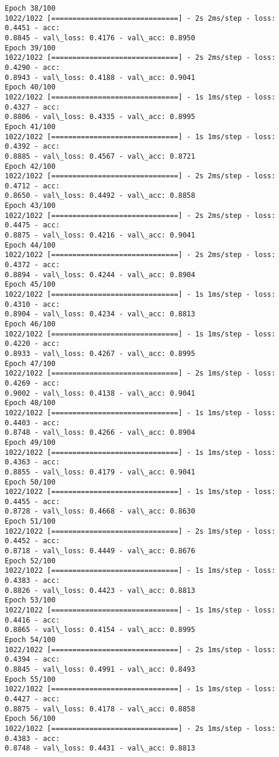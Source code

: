 \documentclass[11pt]{article}
\begin{document}
\begin{Verbatim}[commandchars=\\\{\}]
Epoch 38/100
1022/1022 [==============================] - 2s 2ms/step - loss: 0.4451 - acc:
0.8845 - val\_loss: 0.4176 - val\_acc: 0.8950
Epoch 39/100
1022/1022 [==============================] - 2s 2ms/step - loss: 0.4290 - acc:
0.8943 - val\_loss: 0.4188 - val\_acc: 0.9041
Epoch 40/100
1022/1022 [==============================] - 1s 1ms/step - loss: 0.4327 - acc:
0.8806 - val\_loss: 0.4335 - val\_acc: 0.8995
Epoch 41/100
1022/1022 [==============================] - 1s 1ms/step - loss: 0.4392 - acc:
0.8885 - val\_loss: 0.4567 - val\_acc: 0.8721
Epoch 42/100
1022/1022 [==============================] - 2s 2ms/step - loss: 0.4712 - acc:
0.8650 - val\_loss: 0.4492 - val\_acc: 0.8858
Epoch 43/100
1022/1022 [==============================] - 2s 2ms/step - loss: 0.4475 - acc:
0.8875 - val\_loss: 0.4216 - val\_acc: 0.9041
Epoch 44/100
1022/1022 [==============================] - 2s 2ms/step - loss: 0.4372 - acc:
0.8894 - val\_loss: 0.4244 - val\_acc: 0.8904
Epoch 45/100
1022/1022 [==============================] - 1s 1ms/step - loss: 0.4310 - acc:
0.8904 - val\_loss: 0.4234 - val\_acc: 0.8813
Epoch 46/100
1022/1022 [==============================] - 1s 1ms/step - loss: 0.4220 - acc:
0.8933 - val\_loss: 0.4267 - val\_acc: 0.8995
Epoch 47/100
1022/1022 [==============================] - 2s 1ms/step - loss: 0.4269 - acc:
0.9002 - val\_loss: 0.4138 - val\_acc: 0.9041
Epoch 48/100
1022/1022 [==============================] - 1s 1ms/step - loss: 0.4403 - acc:
0.8748 - val\_loss: 0.4266 - val\_acc: 0.8904
Epoch 49/100
1022/1022 [==============================] - 1s 1ms/step - loss: 0.4363 - acc:
0.8855 - val\_loss: 0.4179 - val\_acc: 0.9041
Epoch 50/100
1022/1022 [==============================] - 1s 1ms/step - loss: 0.4455 - acc:
0.8728 - val\_loss: 0.4668 - val\_acc: 0.8630
Epoch 51/100
1022/1022 [==============================] - 2s 1ms/step - loss: 0.4452 - acc:
0.8718 - val\_loss: 0.4449 - val\_acc: 0.8676
Epoch 52/100
1022/1022 [==============================] - 1s 1ms/step - loss: 0.4383 - acc:
0.8826 - val\_loss: 0.4423 - val\_acc: 0.8813
Epoch 53/100
1022/1022 [==============================] - 1s 1ms/step - loss: 0.4416 - acc:
0.8865 - val\_loss: 0.4154 - val\_acc: 0.8995
Epoch 54/100
1022/1022 [==============================] - 2s 1ms/step - loss: 0.4394 - acc:
0.8845 - val\_loss: 0.4991 - val\_acc: 0.8493
Epoch 55/100
1022/1022 [==============================] - 1s 1ms/step - loss: 0.4427 - acc:
0.8875 - val\_loss: 0.4178 - val\_acc: 0.8858
Epoch 56/100
1022/1022 [==============================] - 2s 1ms/step - loss: 0.4383 - acc:
0.8748 - val\_loss: 0.4431 - val\_acc: 0.8813

\end{Verbatim}
\end{document}
